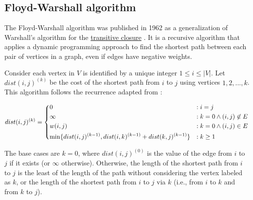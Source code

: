 \subsection{Floyd-Warshall algorithm} \label{algorithm-shortestpath-floydwarshall}
The Floyd-Warshall algorithm was published in 1962 as a generalization of Warshall's algorithm for the \hyperref[def:desc]{transitive closure} \cite[p.~346]{floyd-alg}. It is a \gls{recursive} algorithm that applies a \gls{dynamic programming} approach 
to find the shortest path between each pair of vertices in a graph, even if edges have negative weights.\par
Consider each vertex in $V$ is identified by a unique integer $1 \leq i \leq |V|$.
Let $dist(i, j)^{(k)}$ be the cost of the shortest path from $i$ to $j$ using vertices $1, 2, ..., k$.
This algorithm follows the recurrence adapted from \cite{intro-alg}:

\begin{equation}
    dist(i,j)^{(k)}=\begin{dcases}
        0                                                                &: i=j \\
        \infty                                                           &: k=0 \wedge (i,j) \not \in E \\
        w(i,j)                                                           &: k=0 \wedge (i,j) \in E\\
        \min\{dist(i,j)^{(k-1)}, dist(i,k)^{(k-1)} + dist(k,j)^{(k-1)}\} &: k \geq 1
    \end{dcases}
\end{equation}

The base cases are $k=0$, where $dist(i, j)^{(0)}$ is the value of the edge from $i$ to $j$ if it exists (or $\infty$ otherwise).
Otherwise, the length of the shortest path from $i$ to $j$ is the least of the length of the path without considering the vertex labeled as $k$,
or the length of the shortest path from $i$ to $j$ via $k$ (i.e., from $i$ to $k$ and from $k$ to $j$).\par

